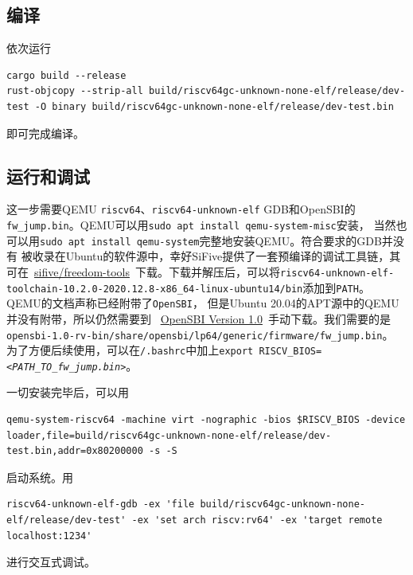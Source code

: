 \documentclass{../runikraft-report}
\begin{document}
\subsection{编译}
依次运行
\begin{lstlisting}
cargo build --release
rust-objcopy --strip-all build/riscv64gc-unknown-none-elf/release/dev-test -O binary build/riscv64gc-unknown-none-elf/release/dev-test.bin
\end{lstlisting}
即可完成编译。

\subsection{运行和调试}
这一步需要QEMU \texttt{riscv64}、\texttt{riscv64-unknown-elf} GDB和OpenSBI的
\texttt{fw\_jump.bin}。QEMU可以用\texttt{sudo apt install qemu-system-misc}安装，
当然也可以用\texttt{sudo apt install qemu-system}完整地安装QEMU。符合要求的GDB并没有
被收录在Ubuntu的软件源中，幸好SiFive提供了一套预编译的调试工具链，其可在\
\href{https://github.com/sifive/freedom-tools/releases}{sifive/freedom-tools}\
下载。下载并解压后，可以将\texttt{riscv64-unknown-elf-toolchain-10.2.0-2020.12.8-x86\_64-linux-ubuntu14/bin}添加到\texttt{PATH}。
QEMU的文档声称已经附带了\texttt{OpenSBI}\cite{qemu-virt}，
但是Ubuntu 20.04的APT源中的QEMU并没有附带，所以仍然需要到
\ \href{https://github.com/riscv-software-src/opensbi/releases/tag/v1.0}{OpenSBI Version 1.0}\
手动下载。我们需要的是\linebreak\texttt{opensbi-1.0-rv-bin/share/opensbi/lp64/generic/firmware/fw\_jump.bin}。
为了方便后续使用，可以在\texttt{\tildechar/.bashrc}中加上\texttt{export RISCV\_BIOS=\textit{<PATH\_TO\_fw\_jump.bin>}}。

一切安装完毕后，可以用
\begin{lstlisting}
qemu-system-riscv64 -machine virt -nographic -bios $RISCV_BIOS -device loader,file=build/riscv64gc-unknown-none-elf/release/dev-test.bin,addr=0x80200000 -s -S
\end{lstlisting}
启动系统。用
\begin{lstlisting}
riscv64-unknown-elf-gdb -ex 'file build/riscv64gc-unknown-none-elf/release/dev-test' -ex 'set arch riscv:rv64' -ex 'target remote localhost:1234'
\end{lstlisting}
进行交互式调试。
\end{document}
